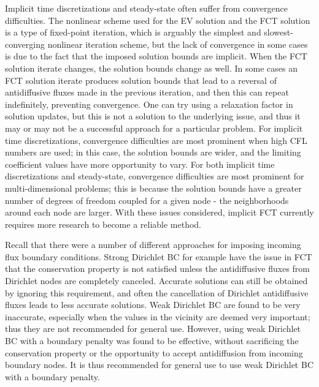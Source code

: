 Implicit time discretizations and steady-state often suffer from convergence
difficulties. The nonlinear scheme used for the EV solution and the FCT
solution is a type of fixed-point iteration, which is arguably the simplest
and slowest-converging nonlinear iteration scheme, but the lack of convergence
in some cases is due to the fact that the imposed solution bounds are implicit.
When the FCT solution iterate changes, the solution bounds change as well.
In some cases an FCT solution iterate produces solution bounds that lead to
a reversal of antidiffusive fluxes made in the previous iteration, and then
this can repeat indefinitely, preventing convergence. One can try using
a relaxation factor in solution updates, but this is not a solution to
the underlying issue, and thus it may or may not be a successful approach
for a particular problem. For implicit time discretizations, convergence
difficulties are most prominent when high CFL numbers are used; in this
case, the solution bounds are wider, and the limiting coefficient values
have more opportunity to vary. For both implicit time discretizations and
steady-state, convergence difficulties are most prominent for multi-dimensional
problems; this is because the solution bounds have a greater number of
degrees of freedom coupled for a given node - the neighborhoods around
each node are larger. With these issues considered, implicit FCT
currently requires more research to become a reliable method.

Recall that there were a number of different approaches for imposing
incoming flux boundary conditions. Strong Dirichlet BC for example
have the issue in FCT that the conservation property is not satisfied
unless the antidiffusive fluxes from Dirichlet nodes are completely
canceled. Accurate solutions can still be obtained by ignoring this
requirement, and often the cancellation of Dirichlet antidiffusive fluxes
leads to less accurate solutions.
Weak Dirichlet BC are found to be very inaccurate,
especially when the values in the vicinity are deemed very important;
thus they are not recommended for general use. However, using weak
Dirichlet BC with a boundary penalty was found to be effective, without
sacrificing the conservation property or the opportunity to accept
antidiffusion from incoming boundary nodes. It is thus recommended
for general use to use weak Dirichlet BC with a boundary penalty.

